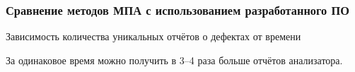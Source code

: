 \documentclass[10pt,gray]{beamer}
\begin{document}

\begin{frame}
\frametitle{Сравнение методов МПА с использованием разработанного ПО}
Зависимость количества уникальных отчётов о дефектах от времени
\begin{figure}[h]
  \begin{minipage}[h]{0.49\linewidth}
  \end{minipage}
  \hfill
  \begin{minipage}[h]{0.49\linewidth}
  \end{minipage}
\end{figure}
  За одинаковое время можно получить в 3--4 раза больше отчётов анализатора.
\end{frame}
\end{document}
